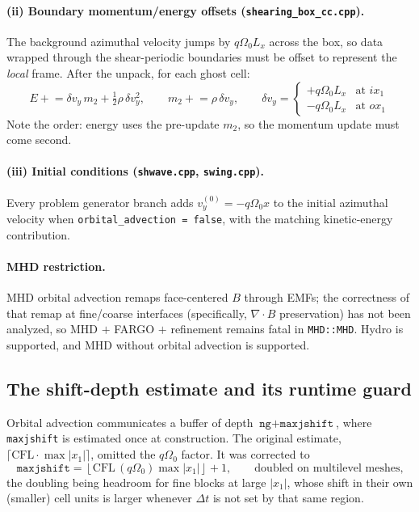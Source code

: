 \documentclass[11pt]{article}
\newcommand{\code}[1]{\texttt{#1}}
\newcommand{\file}[1]{\texttt{\small #1}}
\newcommand{\fn}[1]{\texttt{\small #1}}
\newcommand{\Om}{\Omega_0}
\newcommand{\qom}{q\Om}
\begin{document}
\paragraph{(ii) Boundary momentum/energy offsets (\file{shearing\_box\_cc.cpp}).} The
background azimuthal velocity jumps by $\qom L_x$ across the box, so data wrapped
through the shear-periodic boundaries must be offset to represent the \emph{local}
frame. After the unpack, for each ghost cell:
\begin{equation}
  E \mathrel{+}= \delta v_y\, m_2 + \tfrac{1}{2}\rho\, \delta v_y^2, \qquad
  m_2 \mathrel{+}= \rho\, \delta v_y, \qquad
  \delta v_y = \begin{cases} +\qom L_x & \text{at } ix_1 \\
                             -\qom L_x & \text{at } ox_1 \end{cases}
\end{equation}
Note the order: energy uses the pre-update $m_2$, so the momentum update must come
second.

\paragraph{(iii) Initial conditions (\file{shwave.cpp}, \file{swing.cpp}).} Every
problem generator branch adds $v_y^{(0)} = -\qom x$ to the initial azimuthal velocity
when \code{orbital\_advection = false}, with the matching kinetic-energy contribution.

\paragraph{MHD restriction.} MHD orbital advection remaps face-centered $B$ through
EMFs; the correctness of that remap at fine/coarse interfaces (specifically,
$\nabla\!\cdot\!B$ preservation) has not been analyzed, so MHD $+$ FARGO $+$
refinement remains fatal in \fn{MHD::MHD}. Hydro is supported, and MHD without
orbital advection is supported.

\subsection{The shift-depth estimate and its runtime guard}
\label{sec:maxjshift}

Orbital advection communicates a buffer of depth $\code{ng} + \code{maxjshift}$, where
\code{maxjshift} is estimated once at construction. The original estimate,
$\lceil \mathrm{CFL} \cdot \max|x_1| \rceil$, omitted the $\qom$ factor. It was
corrected to
\begin{equation}
  \code{maxjshift} = \left\lfloor \mathrm{CFL}\,(\qom)\max|x_1| \right\rfloor + 1,
  \qquad \text{doubled on multilevel meshes,}
\end{equation}
the doubling being headroom for fine blocks at large $|x_1|$, whose shift in their own
(smaller) cell units is larger whenever $\Delta t$ is not set by that same region.
\end{document}
